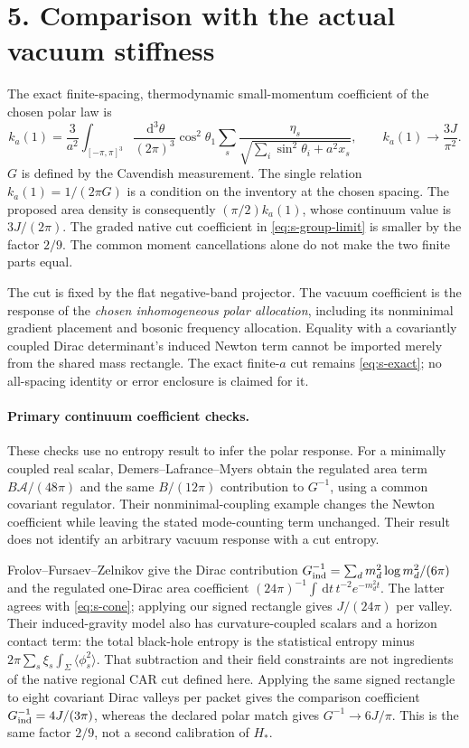 \documentclass[10pt]{article}
\newcommand{\dd}{\,\mathrm d}
\begin{document}
\section*{5. Comparison with the actual vacuum stiffness}
The exact finite-spacing, thermodynamic small-momentum coefficient
of the chosen polar law is
\[
 k_a(1)=\frac3{a^2}\int_{[-\pi,\pi]^3}
 \frac{\dd^3\theta}{(2\pi)^3}\cos^2\theta_1
 \sum_s\frac{\eta_s}{\sqrt{\sum_i\sin^2\theta_i+a^2x_s}},
 \qquad k_a(1)\longrightarrow\frac{3J}{\pi^2}.
\]
$G$ is defined by the Cavendish measurement. The single relation
$k_a(1)=1/(2\pi G)$ is a condition on the inventory at the chosen
spacing. The proposed area density is consequently
$(\pi/2)k_a(1)$, whose continuum value is $3J/(2\pi)$.
The graded native cut coefficient in \eqref{eq:s-group-limit} is
smaller by the factor $2/9$. The common moment cancellations alone
do not make the two finite parts equal.

The cut is fixed by the flat negative-band projector. The vacuum
coefficient is the response of the \emph{chosen inhomogeneous polar
allocation}, including its nonminimal gradient placement and
bosonic frequency allocation. Equality with a covariantly coupled
Dirac determinant's induced Newton term cannot be imported merely
from the shared mass rectangle. The exact finite-$a$ cut remains
\eqref{eq:s-exact}; no all-spacing identity or error enclosure is
claimed for it.

\paragraph{Primary continuum coefficient checks.}
These checks use no entropy result to infer the polar response.
For a minimally coupled real scalar, Demers--Lafrance--Myers
obtain the regulated area term $B\mathcal A/(48\pi)$ and the
same $B/(12\pi)$ contribution to $G^{-1}$, using a common
covariant regulator. Their nonminimal-coupling example changes the
Newton coefficient while leaving the stated mode-counting term
unchanged. Their result does not identify an arbitrary vacuum
response with a cut entropy.

Frolov--Fursaev--Zelnikov give the Dirac contribution
$G_{\rm ind}^{-1}=\sum_d m_d^2\log m_d^2/(6\pi)$ and the
regulated one-Dirac area coefficient
$(24\pi)^{-1}\int\dd t\,t^{-2}e^{-m_d^2t}$.
The latter agrees with \eqref{eq:s-cone}; applying our signed
rectangle gives $J/(24\pi)$ per valley. Their induced-gravity
model also has curvature-coupled scalars and a horizon contact term:
the total black-hole entropy is the statistical entropy minus
$2\pi\sum_s\xi_s\int_\Sigma\langle\phi_s^2\rangle$.
That subtraction and their field constraints are not ingredients
of the native regional CAR cut defined here. Applying the same
signed rectangle to eight covariant Dirac valleys per packet gives
the comparison coefficient
$G_{\rm ind}^{-1}=4J/(3\pi)$, whereas the declared polar match
gives $G^{-1}\to6J/\pi$. This is the same factor $2/9$, not a
second calibration of $H_*$.
\end{document}
